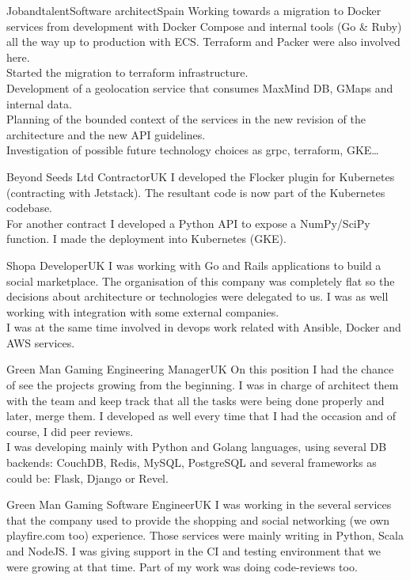 \documentclass[11pt, a4paper, sans]{moderncv}
\begin{document}
{Jobandtalent}{Software architect}{Spain}{}
{Working towards a migration to Docker services from development with
  Docker Compose and internal tools (Go \& Ruby) all the way up to
  production with ECS. Terraform and Packer were also involved here.\\
  Started the migration to terraform infrastructure.\\
Development of a geolocation service that consumes MaxMind DB, GMaps and
internal data.\\
Planning of the bounded context of the services in the new revision of the
architecture and the new API guidelines.\\
Investigation of possible future technology choices as grpc, terraform, GKE\ldots\\}

{Beyond Seeds Ltd}
{Contractor}{UK}{}
{I developed the Flocker plugin for Kubernetes (contracting with Jetstack). The resultant code is now part of the Kubernetes codebase.\\
For another contract I developed a Python API to expose a NumPy/SciPy function. I made the deployment into Kubernetes (GKE).\\}

{Shopa}
{Developer}{UK}{}
{I was working with Go and Rails applications to build a social marketplace. The
organisation of this company was completely flat so the decisions about
architecture or technologies were delegated to us. I was as well working with
integration with some external companies.\\I was at the same time involved in
devops work related with Ansible, Docker and AWS services.\\}

{Green Man Gaming}
{Engineering Manager}{UK}{}
{On this position I had the chance of see the projects growing from the
beginning. I was in charge of architect them with the team and keep track that
all the tasks were being done properly and later, merge them. I developed  as
well every time that I had the occasion and of course, I did peer reviews.\\I
was developing mainly with Python and Golang languages, using several DB
backends: CouchDB, Redis, MySQL, PostgreSQL and several frameworks as could be:
Flask, Django or Revel.\\}

{Green Man Gaming}
{Software Engineer}{UK}{}
{I was working in the several services that the company used to provide the
shopping and social networking (we own playfire.com too) experience. Those
services were mainly writing in Python, Scala and NodeJS. I was giving support
in the CI and testing environment that we were growing at that time. Part of my
work was doing code-reviews too.\\}
\end{document}
